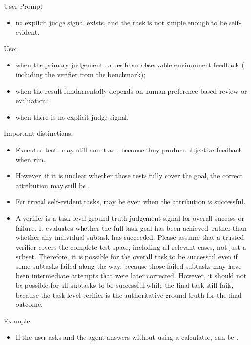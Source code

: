 \begin{svpromptbox}{User Prompt}
\begin{itemize}
\item no explicit judge signal exists, and the task is not simple enough to be self-evident.
\end{itemize}
\smallskip
{}
\smallskip
Use:\par
\smallskip
\begin{itemize}
\item {} when the primary judgement comes from observable environment feedback ( including the verifier from the benchmark);
\item {} when the result fundamentally depends on human preference-based review or evaluation;
\item {} when there is no explicit judge signal.
\end{itemize}
\smallskip
Important distinctions:\par
\smallskip
\begin{itemize}
\item Executed tests may still count as , because they produce objective feedback when run.
\item However, if it is unclear whether those tests fully cover the goal, the correct attribution may still be .
\item For trivial self-evident tasks,  may be  even when the attribution is successful.
\item A verifier is a task-level ground-truth judgement signal for overall success or failure. It evaluates whether the full task goal has been achieved, rather than whether any individual subtask has succeeded. Please assume that a trusted verifier covers the complete test space, including all relevant cases, not just a subset. Therefore, it is possible for the overall task to be successful even if some subtasks failed along the way, because those failed subtasks may have been intermediate attempts that were later corrected. However, it should not be possible for all subtasks to be successful while the final task still fails, because the task-level verifier is the authoritative ground truth for the final outcome.
\end{itemize}
\smallskip
Example:\par
\smallskip
\begin{itemize}
\item If the user asks  and the agent answers  without using a calculator,  can be .

\end{itemize}
\end{svpromptbox}
